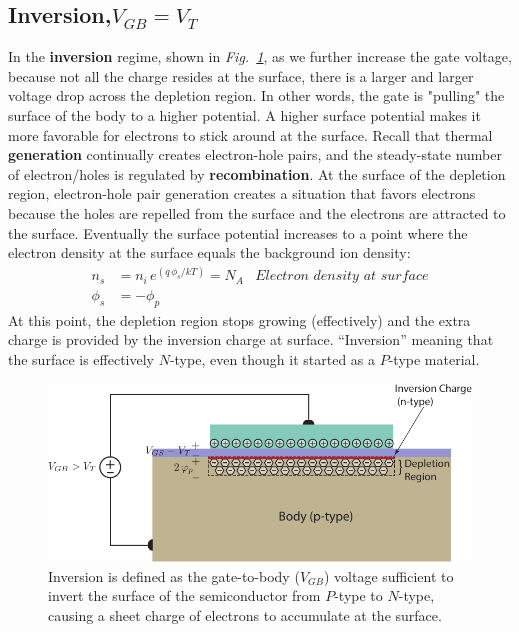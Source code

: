 \subsection{Inversion\texorpdfstring{,\;$V_{GB}=V_T$}{}}
In the \textbf{inversion} regime, shown in \emph{Fig.~\ref{fig:mos_inv}}, as we further increase the gate voltage, because not all the charge resides at the surface, there is a larger and larger voltage drop across the depletion region.  In other words, the gate is "pulling" the surface of the body to a higher potential.  A higher surface potential makes it more favorable for electrons to stick around at the surface.  Recall that thermal \textbf{generation} continually creates electron-hole pairs, and the steady-state number of electron/holes is regulated by \textbf{recombination}.  At the surface of the depletion region, electron-hole pair generation creates a situation that favors electrons because the holes are repelled from the surface and the electrons are attracted to the surface.  Eventually the surface potential increases to a point where the electron density at the surface equals the background ion density:
    \begin{align}
        n_s &= n_i\,e^{(q\,\phi_s/kT)} = N_A &\textit{Electron density at surface}\\[0.25cm]
        \phi_s &= -\phi_p
    \end{align}
At this point, the depletion region stops growing (effectively) and the extra charge is provided by the inversion charge at surface.  “Inversion” meaning that the surface is effectively $N$-type, even though it started as a $P$-type material.  
\begin{figure}[H]
\centering
\includegraphics[width=\columnwidth]{mos_cap_inversion}
\caption{Inversion is defined as the gate-to-body ($V_{GB}$) voltage sufficient to invert the surface of the semiconductor from $P$-type to $N$-type, causing a sheet charge of electrons to accumulate at the surface.}
\label{fig:mos_inv}
\end{figure}
